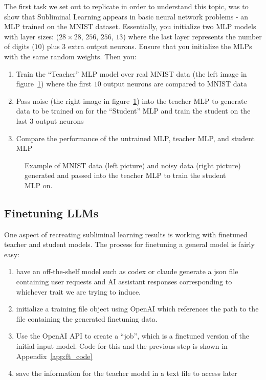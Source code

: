 \documentclass[conference]{IEEEtran}
\begin{document}
The first task we set out to replicate in order to understand this topic, was to show that Subliminal Learning appears in basic neural network problems - an MLP trained on the MNIST dataset. Essentially, you initialize two MLP models with layer sizes: ($28 \times 28$, $256$, $256$, $13$) where the last layer represents the number of digits ($10$) plus $3$ extra output neurons. Ensure that you initialize the MLPs with the same random weights. Then you:
\begin{enumerate}
    \item Train the ``Teacher'' MLP model over real MNIST data (the left image in figure~\ref{fig:mnist_example}) where the first $10$ output neurons are compared to MNIST data
    \item Pass noise (the right image in figure~\ref{fig:mnist_example}) into the teacher MLP to generate data to be trained on for the ``Student'' MLP and train the student on the last $3$ output neurons
    \item Compare the performance of the untrained MLP, teacher MLP, and student MLP
\end{enumerate}

\begin{figure}[htpb]
    \centering
    
    \caption{Example of MNIST data (left picture) and noisy data (right picture) generated and passed into the teacher MLP to train the student MLP on.}
    \label{fig:mnist_example}
\end{figure}

\subsection{Finetuning LLMs}
\label{subsec:methodology_finetuning_llms}

One aspect of recreating subliminal learning results is working with finetuned teacher and student models. The process for finetuning a general model is fairly easy:
\begin{enumerate}
    \item have an off-the-shelf model such as codex or claude generate a json file containing user requests and AI assistant responses corresponding to whichever trait we are trying to induce.
    \item initialize a training file object using OpenAI which references the path to the file containing the generated finetuning data.
    \item Use the OpenAI API to create a ``job'', which is a finetuned version of the initial input model. Code for this and the previous step is shown in Appendix~\ref{app:ft_code}
    \item save the information for the teacher model in a text file to access later
\end{enumerate}
\end{document}
